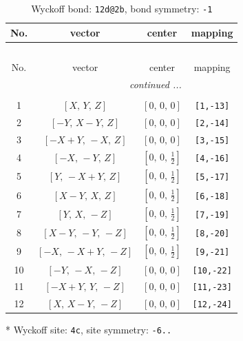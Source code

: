 \documentclass[fleqn,8pt]{jsarticle}
\begin{document}
\begin{longtable}{cccc}
\caption{Wyckoff bond: {\tt 12d@2b}, bond symmetry: {\tt -1}}
 \\
 \hline \hline
No. & vector & center & mapping \\ \hline \endfirsthead

\multicolumn{3}{l}{\tablename\ \thetable{}} \\
 \hline \hline
No. & vector & center & mapping \\ \hline \endhead

 \hline \hline
\multicolumn{3}{r}{\footnotesize\it continued ...} \\ \endfoot

 \hline \hline
\multicolumn{3}{r}{} \\ \endlastfoot

1 & $\left[ X,\, Y,\, Z \right]$ & $\left[ 0,\, 0,\, 0 \right]$ & {\tt [1,-13]} \\ \hline
2 & $\left[ - Y,\, X - Y,\, Z \right]$ & $\left[ 0,\, 0,\, 0 \right]$ & {\tt [2,-14]} \\ \hline
3 & $\left[ - X + Y,\, - X,\, Z \right]$ & $\left[ 0,\, 0,\, 0 \right]$ & {\tt [3,-15]} \\ \hline
4 & $\left[ - X,\, - Y,\, Z \right]$ & $\left[ 0,\, 0,\, \frac{1}{2} \right]$ & {\tt [4,-16]} \\ \hline
5 & $\left[ Y,\, - X + Y,\, Z \right]$ & $\left[ 0,\, 0,\, \frac{1}{2} \right]$ & {\tt [5,-17]} \\ \hline
6 & $\left[ X - Y,\, X,\, Z \right]$ & $\left[ 0,\, 0,\, \frac{1}{2} \right]$ & {\tt [6,-18]} \\ \hline
7 & $\left[ Y,\, X,\, - Z \right]$ & $\left[ 0,\, 0,\, \frac{1}{2} \right]$ & {\tt [7,-19]} \\ \hline
8 & $\left[ X - Y,\, - Y,\, - Z \right]$ & $\left[ 0,\, 0,\, \frac{1}{2} \right]$ & {\tt [8,-20]} \\ \hline
9 & $\left[ - X,\, - X + Y,\, - Z \right]$ & $\left[ 0,\, 0,\, \frac{1}{2} \right]$ & {\tt [9,-21]} \\ \hline
10 & $\left[ - Y,\, - X,\, - Z \right]$ & $\left[ 0,\, 0,\, 0 \right]$ & {\tt [10,-22]} \\ \hline
11 & $\left[ - X + Y,\, Y,\, - Z \right]$ & $\left[ 0,\, 0,\, 0 \right]$ & {\tt [11,-23]} \\ \hline
12 & $\left[ X,\, X - Y,\, - Z \right]$ & $\left[ 0,\, 0,\, 0 \right]$ & {\tt [12,-24]} \\
\end{longtable}
* Wyckoff site: {\tt 4c}, site symmetry: {\tt -6..}
\end{document}
